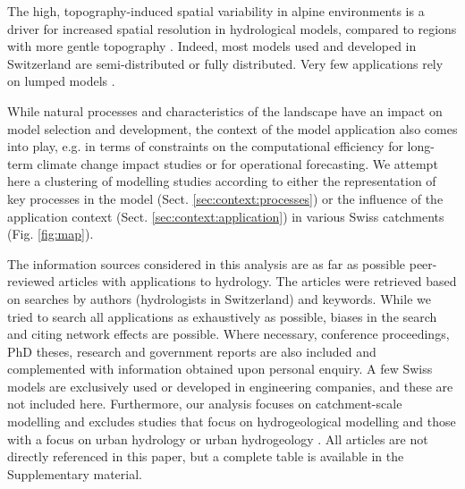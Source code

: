 \documentclass[10pt,a4paper]{article}
\begin{document}
The high, topography-induced spatial variability in alpine environments is a driver for increased spatial resolution in hydrological models, compared to regions with more gentle topography \citep{Gurtz2003}. Indeed, most models used and developed in Switzerland are semi-distributed or fully distributed. Very few applications rely on lumped models \citep[for example,][]{Keller2019a}.

While natural processes and characteristics of the landscape have an impact on model selection and development, the context of the model application also comes into play, e.g. in terms of constraints on the computational efficiency for long-term climate change impact studies or for operational forecasting. We attempt here a clustering of modelling studies according to either the representation of key processes in the model (Sect. \ref{sec:context:processes}) or the influence of the application context (Sect. \ref{sec:context:application}) in various Swiss catchments (Fig. \ref{fig:map}).

The information sources considered in this analysis are as far as possible peer-reviewed articles with applications to hydrology. The articles were retrieved based on searches by authors (hydrologists in Switzerland) and keywords. While we tried to search all applications as exhaustively as possible, biases in the search and citing network effects are possible. Where necessary, conference proceedings, PhD theses, research and government reports are also included and complemented with information obtained upon personal enquiry. A few Swiss models are exclusively used or developed in engineering companies, and these are not included here. Furthermore, our analysis focuses on catchment-scale modelling and excludes studies that focus on hydrogeological modelling \citep{Carlier2019} and those with a focus on urban hydrology \citep{Peleg2017} or urban hydrogeology \citep{Schirmer2013}. All articles are not directly referenced in this paper, but a complete table is available in the Supplementary material.
\end{document}
